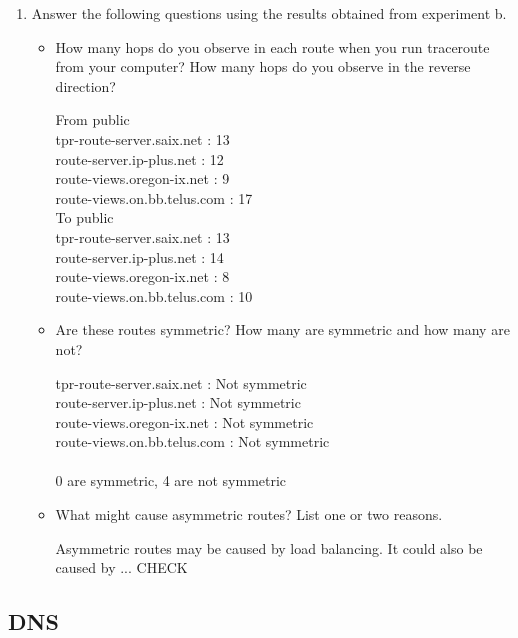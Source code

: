 \documentclass[10pt]{article}
\begin{document}
\begin{enumerate}
\begin{itemize}
\end{itemize}

\item Answer the following questions using the results obtained from experiment b.

\begin{itemize}

\item How many hops do you observe in each route when you run traceroute from your computer? How many hops do you observe in the reverse direction?

From public \\
tpr-route-server.saix.net : 13 \\
route-server.ip-plus.net : 12 \\
route-views.oregon-ix.net : 9 \\
route-views.on.bb.telus.com : 17 \\

To public \\
tpr-route-server.saix.net : 13 \\
route-server.ip-plus.net : 14 \\
route-views.oregon-ix.net : 8 \\
route-views.on.bb.telus.com : 10 \\

\item Are these routes symmetric? How many are symmetric and how many are not?

tpr-route-server.saix.net : Not symmetric \\
route-server.ip-plus.net : Not symmetric \\
route-views.oregon-ix.net : Not symmetric \\
route-views.on.bb.telus.com : Not symmetric \\
\\
0 are symmetric, 4 are not symmetric

\item What might cause asymmetric routes? List one or two reasons.

Asymmetric routes may be caused by load balancing. It could also be caused by ... CHECK

\end{itemize}
\end{enumerate}

\newpage
\subsection*{DNS}
\end{document}
